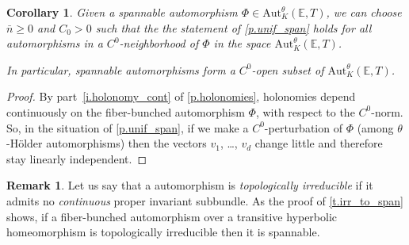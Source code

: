 \documentclass[10pt]{amsart}
\theoremstyle{plain}
\newtheorem{corollary}[theorem]{Corollary}
\theoremstyle{definition}
\newtheorem{remark}[theorem]{Remark}
\newcommand{\EE}{\mathbb{E}}
\newcommand{\Aut}{\mathrm{Aut}}
\begin{document}
\begin{corollary}\label{c.open_span}
Given a spannable automorphism $\Phi \in \Aut^\theta_K(\EE,T)$, we can choose $\bar{n} \ge 0$ and $C_0 > 0$ such that the the statement of \cref{p.unif_span} holds for all automorphisms in a $C^0$-neighborhood of $\Phi$ in the space $\Aut^\theta_K(\EE,T)$.

In particular, spannable automorphisms form a $C^0$-open subset of $\Aut^\theta_K(\EE,T)$.
\end{corollary}

\begin{proof}
By part~\eqref{i.holonomy_cont} of \cref{p.holonomies}, holonomies depend continuously on the fiber-bunched automorphism $\Phi$, with respect to the $C^0$-norm.
So, in the situation of \cref{p.unif_span}, if we make a $C^0$-perturbation of $\Phi$ (among $\theta$-Hölder automorphisms) then the vectors $v_1$, \dots, $v_d$ change little and therefore stay linearly independent.
\end{proof}

\begin{remark}
Let us say that a automorphism is \emph{topologically irreducible} if it admits no \emph{continuous} proper invariant subbundle. As the proof of \cref{t.irr_to_span} shows, if a fiber-bunched automorphism over a transitive hyperbolic homeomorphism is topologically irreducible then it is spannable.
\end{remark}
\end{document}
